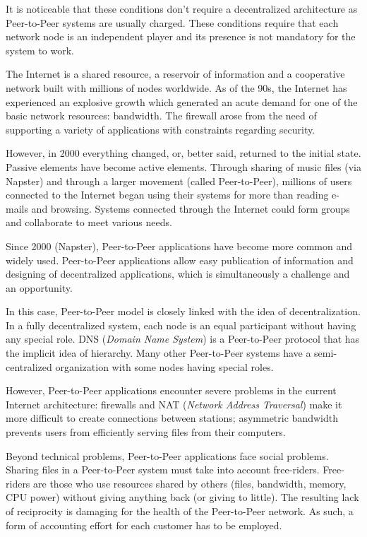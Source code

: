 It is noticeable that these conditions don't require a decentralized
architecture as Peer-to-Peer systems are usually charged. These conditions
require that each network node is an independent player and its presence
is not mandatory for the system to work.

The Internet is a shared resource, a reservoir of information and a
cooperative network built with millions of nodes worldwide. As of the 90s, the
Internet has experienced an explosive growth which generated an acute demand
for one of the basic network resources: bandwidth. The firewall arose from the
need of supporting a variety of applications with constraints regarding
security.

However, in 2000 everything changed, or, better said, returned to the initial
state. Passive elements have become active elements. Through sharing of music
files (via Napster) and through a larger movement (called Peer-to-Peer),
millions of users connected to the Internet began using their systems
for more than reading e-mails and browsing. Systems connected through the
Internet could form groups and collaborate to meet various needs.

Since 2000 (Napster), Peer-to-Peer applications have become more common and
widely used. Peer-to-Peer applications allow easy publication of information
and designing of decentralized applications, which is simultaneously a
challenge and an opportunity.

In this case, Peer-to-Peer model is closely linked with the idea of
decentralization. In a fully decentralized system, each node is an equal
participant without having any special role. DNS (\textit{Domain Name System})
is a Peer-to-Peer protocol that has the implicit idea of hierarchy. Many other
Peer-to-Peer systems have a semi-centralized organization with some nodes
having special roles.

However, Peer-to-Peer applications encounter severe problems in the current
Internet architecture: firewalls and NAT (\textit{Network Address Traversal})
make it more difficult to create connections between stations; asymmetric
bandwidth prevents users from efficiently serving files from their computers.

Beyond technical problems, Peer-to-Peer applications face social problems.
Sharing files in a Peer-to-Peer system must take into account free-riders.
Free-riders are those who use resources shared by others (files, bandwidth,
memory, CPU power) without giving anything back (or giving to little). The
resulting lack of reciprocity is damaging for the health of the Peer-to-Peer
network. As such, a form of accounting effort for each customer has to be
employed.

